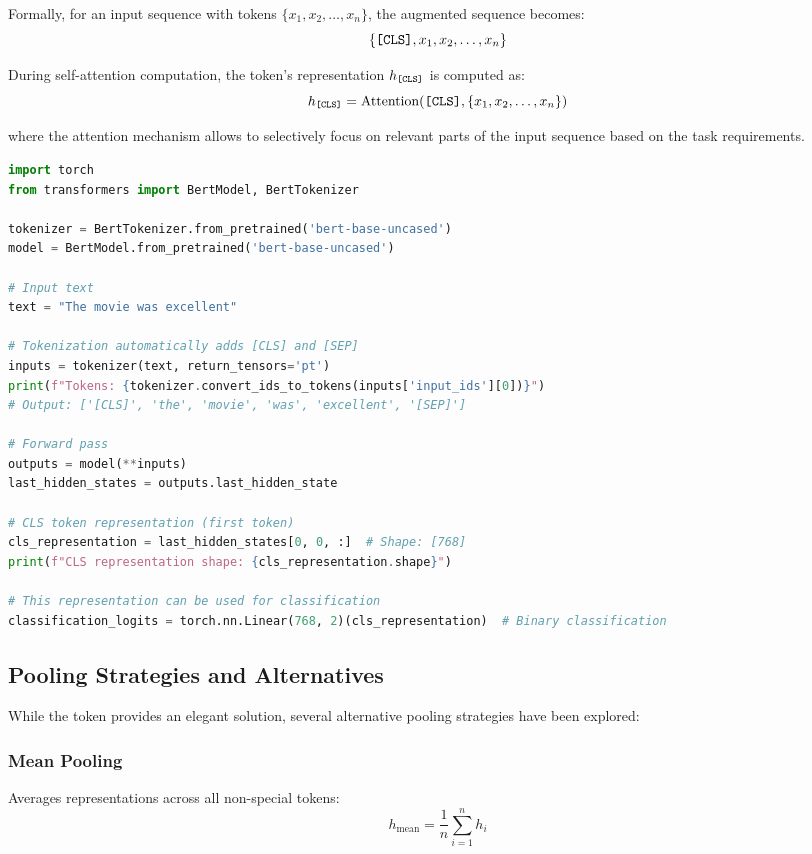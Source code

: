 Formally, for an input sequence with tokens $\{x_1, x_2, \ldots, x_n\}$, the augmented sequence becomes:
$$\{\texttt{[CLS]}{}, x_1, x_2, \ldots, x_n\}$$

During self-attention computation, the \cls{} token's representation $h_{\texttt{[CLS]}{}}$ is computed as:
$$h_{\texttt{[CLS]}{}} = \text{Attention}(\texttt{[CLS]}{}, \{x_1, x_2, \ldots, x_n\})$$

where the attention mechanism allows \cls{} to selectively focus on relevant parts of the input sequence based on the task requirements.

\begin{example}
\begin{lstlisting}[language=Python]
import torch
from transformers import BertModel, BertTokenizer

tokenizer = BertTokenizer.from_pretrained('bert-base-uncased')
model = BertModel.from_pretrained('bert-base-uncased')

# Input text
text = "The movie was excellent"

# Tokenization automatically adds [CLS] and [SEP]
inputs = tokenizer(text, return_tensors='pt')
print(f"Tokens: {tokenizer.convert_ids_to_tokens(inputs['input_ids'][0])}")
# Output: ['[CLS]', 'the', 'movie', 'was', 'excellent', '[SEP]']

# Forward pass
outputs = model(**inputs)
last_hidden_states = outputs.last_hidden_state

# CLS token representation (first token)
cls_representation = last_hidden_states[0, 0, :]  # Shape: [768]
print(f"CLS representation shape: {cls_representation.shape}")

# This representation can be used for classification
classification_logits = torch.nn.Linear(768, 2)(cls_representation)  # Binary classification
\end{lstlisting}
\end{example}

\subsection{Pooling Strategies and Alternatives}

While the \cls{} token provides an elegant solution, several alternative pooling strategies have been explored:

\subsubsection{Mean Pooling}
Averages representations across all non-special tokens:
$$h_{\text{mean}} = \frac{1}{n} \sum_{i=1}^{n} h_i$$

